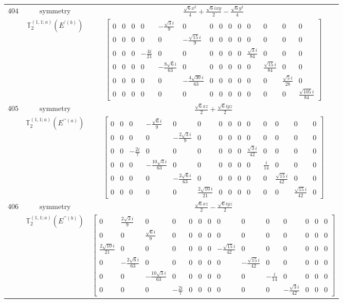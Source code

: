 \documentclass[fleqn,8pt,landscape]{jsarticle}
\begin{document}
\begin{longtable}{ccc}
$ 404 $ & $ \text{symmetry} $ & $ \frac{\sqrt{6} x^{2}}{4} + \frac{\sqrt{6} i x y}{2} - \frac{\sqrt{6} y^{2}}{4} $ \\
$  $ & $ \mathbb{T}_{2}^{(1,1;a)}(E^{\prime(b)}) $ & $ \begin{bmatrix} 0 & 0 & 0 & 0 & - \frac{\sqrt{3} i}{9} & 0 & 0 & 0 & 0 & 0 & 0 & 0 & 0 & 0 \\ 0 & 0 & 0 & 0 & 0 & - \frac{\sqrt{15} i}{9} & 0 & 0 & 0 & 0 & 0 & 0 & 0 & 0 \\ 0 & 0 & 0 & - \frac{4 i}{21} & 0 & 0 & 0 & 0 & 0 & 0 & \frac{\sqrt{3} i}{84} & 0 & 0 & 0 \\ 0 & 0 & 0 & 0 & - \frac{8 \sqrt{6} i}{63} & 0 & 0 & 0 & 0 & 0 & 0 & \frac{\sqrt{15} i}{84} & 0 & 0 \\ 0 & 0 & 0 & 0 & 0 & - \frac{4 \sqrt{30} i}{63} & 0 & 0 & 0 & 0 & 0 & 0 & \frac{\sqrt{5} i}{28} & 0 \\ 0 & 0 & 0 & 0 & 0 & 0 & 0 & 0 & 0 & 0 & 0 & 0 & 0 & \frac{\sqrt{105} i}{84} \end{bmatrix} $ \\ \hline
$ 405 $ & $ \text{symmetry} $ & $ \frac{\sqrt{6} x z}{2} + \frac{\sqrt{6} i y z}{2} $ \\
$  $ & $ \mathbb{T}_{2}^{(1,1;a)}(E^{\prime\prime(a)}) $ & $ \begin{bmatrix} 0 & 0 & 0 & - \frac{\sqrt{6} i}{9} & 0 & 0 & 0 & 0 & 0 & 0 & 0 & 0 & 0 & 0 \\ 0 & 0 & 0 & 0 & - \frac{2 \sqrt{3} i}{9} & 0 & 0 & 0 & 0 & 0 & 0 & 0 & 0 & 0 \\ 0 & 0 & - \frac{2 i}{7} & 0 & 0 & 0 & 0 & 0 & 0 & \frac{\sqrt{3} i}{42} & 0 & 0 & 0 & 0 \\ 0 & 0 & 0 & - \frac{10 \sqrt{3} i}{63} & 0 & 0 & 0 & 0 & 0 & 0 & \frac{i}{14} & 0 & 0 & 0 \\ 0 & 0 & 0 & 0 & - \frac{2 \sqrt{6} i}{63} & 0 & 0 & 0 & 0 & 0 & 0 & \frac{\sqrt{15} i}{42} & 0 & 0 \\ 0 & 0 & 0 & 0 & 0 & \frac{2 \sqrt{10} i}{21} & 0 & 0 & 0 & 0 & 0 & 0 & \frac{\sqrt{15} i}{42} & 0 \end{bmatrix} $ \\ \hline
$ 406 $ & $ \text{symmetry} $ & $ \frac{\sqrt{6} x z}{2} - \frac{\sqrt{6} i y z}{2} $ \\
$  $ & $ \mathbb{T}_{2}^{(1,1;a)}(E^{\prime\prime(b)}) $ & $ \begin{bmatrix} 0 & \frac{2 \sqrt{3} i}{9} & 0 & 0 & 0 & 0 & 0 & 0 & 0 & 0 & 0 & 0 & 0 & 0 \\ 0 & 0 & \frac{\sqrt{6} i}{9} & 0 & 0 & 0 & 0 & 0 & 0 & 0 & 0 & 0 & 0 & 0 \\ \frac{2 \sqrt{10} i}{21} & 0 & 0 & 0 & 0 & 0 & 0 & - \frac{\sqrt{15} i}{42} & 0 & 0 & 0 & 0 & 0 & 0 \\ 0 & - \frac{2 \sqrt{6} i}{63} & 0 & 0 & 0 & 0 & 0 & 0 & - \frac{\sqrt{15} i}{42} & 0 & 0 & 0 & 0 & 0 \\ 0 & 0 & - \frac{10 \sqrt{3} i}{63} & 0 & 0 & 0 & 0 & 0 & 0 & - \frac{i}{14} & 0 & 0 & 0 & 0 \\ 0 & 0 & 0 & - \frac{2 i}{7} & 0 & 0 & 0 & 0 & 0 & 0 & - \frac{\sqrt{3} i}{42} & 0 & 0 & 0 \end{bmatrix} $ \\ \hline

\end{longtable}
\end{document}
